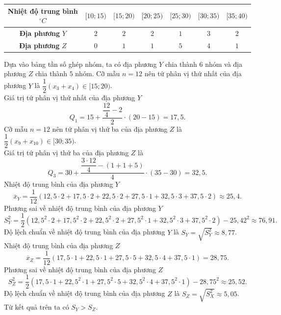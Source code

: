 \begin{ex}
{\begin{longtable}{|c|c|c|c|c|c|c|}
\hline
\textbf{Nhiệt độ trung bình} $^\circ C$&$[10;15)$&$[15;20)$&$[20;25)$&$[25;30)$&$[30;35)$&$[35;40)$\\
\hline
\textbf{Địa phương} $Y$&$2$&$2$&$2$&$1$&$3$&$2$\\
\hline
\textbf{Địa phương} $Z$&$0$&$1$&$1$&$5$&$4$&$1$\\
\hline
\end{longtable}\vspace{-5mm}
\begin{itemchoice}
\itemch Dựa vào bảng tần số ghép nhóm, ta có địa phương $Y$ chia thành $6$ nhóm và địa phương $Z$ chia thành $5$ nhóm.
\itemch Cỡ mẫu $n=12$ nên tứ phân vị thứ nhất của địa phương $Y$ là $\dfrac{1}{2}\left(x_3+x_4\right)\in [15;20)$.\\
Giá trị tứ phân vị thứ nhất của địa phương $Y$ $$Q_1=15+\dfrac{\dfrac{12}{4}-2}{2}\cdot (20-15)=17{,}5.$$
\itemch Cỡ mẫu $n=12$ nên tứ phân vị thứ ba của địa phương $Z$ là $\dfrac{1}{2}\left(x_9+x_{10}\right)\in [30;35)$.\\
Giá trị tứ phân vị thứ ba của địa phương $Z$ là $$Q_3=30+\dfrac{\dfrac{3\cdot 12}{4}-(1+1+5)}{4}\cdot (35-30)=32{,}5.$$
\itemch Nhiệt độ trung bình của địa phương $Y$
$$\overline{x}_Y=\dfrac{1}{12}\left(12{,}5\cdot 2+17{,}5\cdot 2+22{,}5\cdot 2+27{,}5\cdot 1+32{,}5\cdot 3+37{,}5\cdot2\right)\approx 25{,}4.$$
Phương sai về nhiệt độ trung bình của địa phương $Y$
$$S^2_Y=\dfrac{1}{2}\left(12{,}5^2\cdot 2+17{,}5^2\cdot 2+22{,}5^2\cdot 2+27{,}5^2\cdot 1+32{,}5^2\cdot 3+37{,}5^2\cdot2 \right)-25{,}42^2\approx76{,}91.$$
Độ lệch chuẩn về nhiệt độ trung bình của địa phương $Y$ là $S_Y=\sqrt{S^2_Y}\approx 8{,}77$.\\
Nhiệt độ trung bình của địa phương $Z$
$$\overline{x}_Z=\dfrac{1}{12}\left(17{,}5\cdot 1+22{,}5\cdot 1+27{,}5\cdot 5+32{,}5\cdot 4+37{,}5\cdot1\right)= 28{,}75. $$
Phương sai về nhiệt độ trung bình của địa phương $Z$
$$S^2_Z=\dfrac{1}{2}\left(17{,}5\cdot 1+22{,}5^2\cdot 1+27{,}5^2\cdot 5+32{,}5^2\cdot 4+37{,}5^2\cdot 1 \right)-28{,}75^2\approx25{,}52.$$
Độ lệch chuẩn về nhiệt độ trung bình của địa phương $Z$ là $S_Z=\sqrt{S^2_X}\approx 5{,}05$.\\
Từ kết quả trên ta có $S_Y>S_Z$.
\end{itemchoice}
}
\end{ex}


